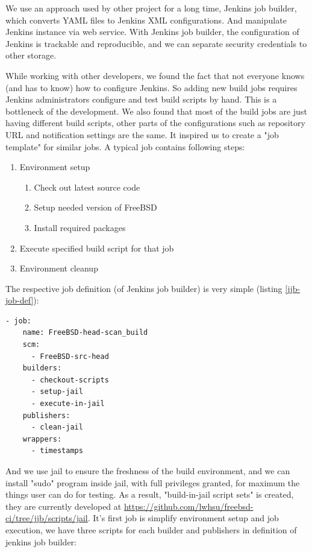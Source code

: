 \documentclass[a4paper,twocolumn,10pt]{article}
\begin{document}
We use an approach used by other project for a long time, Jenkins job builder,
which converts YAML files to Jenkins XML configurations. And manipulate Jenkins
instance via web service. With Jenkins job builder, the configuration of
Jenkins is trackable and reproducible, and we can separate security credentials
to other storage.

While working with other developers, we found the fact that not everyone knows
(and has to know) how to configure Jenkins. So adding new build jobs requires
Jenkins administrators configure and test build scripts by hand. This is a
bottleneck of the development. We also found that most of the build jobs are
just having different build scripts, other parts of the configurations such as
repository URL and notification settings are the same. It inspired us to create
a "job template" for similar jobs. A typical job contains following steps:

\begin{enumerate}
\item Environment setup
  \begin{enumerate}
  \item Check out latest source code
  \item Setup needed version of FreeBSD
  \item Install required packages
  \end{enumerate}
\item Execute specified build script for that job
\item Environment cleanup
\end{enumerate}

The respective job definition (of Jenkins job builder) is very simple
(listing \ref{jjb-job-def}):

\begin{lstlisting}[captionpos=b,caption=Job definition,label=jjb-job-def]
- job:
    name: FreeBSD-head-scan_build
    scm:
      - FreeBSD-src-head
    builders:
      - checkout-scripts
      - setup-jail
      - execute-in-jail
    publishers:
      - clean-jail
    wrappers:
      - timestamps
\end{lstlisting}

And we use jail to ensure the freshness of the build environment, and we can
install "sudo" program inside jail, with full privileges granted, for maximum
the things user can do for testing. As a result, "build-in-jail script sets" is
created, they are currently developed at
\url{https://github.com/lwhsu/freebsd-ci/tree/jjb/scripts/jail}. It's first job
is simplify environment setup and job execution, we have three scripts for each
builder and publishers in definition of jenkins job builder:
\end{document}
